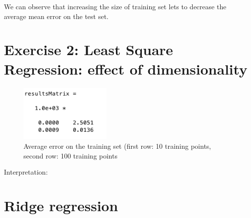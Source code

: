 \documentclass{article} %
\begin{document}
We can observe that increasing the size of training set lets to decrease the average mean error on the test set.

\section{Exercise 2: Least Square Regression: effect of dimensionality}

\begin{figure}[H]
\begin{center}
\includegraphics[width=0.4\textwidth]{resultsMatrix2}
\end{center}
\caption{Average error on the training set (first row: 10 training points, second row: 100 training points}
\end{figure}

Interpretation: 

\section{Ridge regression}
\end{document}
